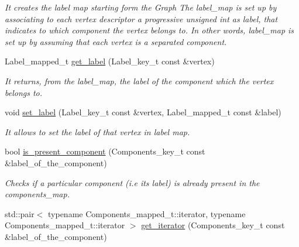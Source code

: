 \begin{DoxyCompactItemize}
\begin{DoxyCompactList}\small\item\em It creates the label map starting form the Graph  The label\_\-map is set up by associating to each vertex descriptor a progressive unsigned int as label, that indicates to which component the vertex belongs to. In other words, label\_\-map is set up by assuming that each vertex is a separated component. \item\end{DoxyCompactList}\item 
\hypertarget{classour__disjoint__sets_a0735914ff4a2a87ec7ee261f1a132a49}{
Label\_\-mapped\_\-t \hyperlink{classour__disjoint__sets_a0735914ff4a2a87ec7ee261f1a132a49}{get\_\-label} (Label\_\-key\_\-t const \&vertex)}
\label{classour__disjoint__sets_a0735914ff4a2a87ec7ee261f1a132a49}

\begin{DoxyCompactList}\small\item\em It returns, from the label\_\-map, the label of the component which the vertex belongs to. \item\end{DoxyCompactList}\item 
\hypertarget{classour__disjoint__sets_a0db082ada0847dac4d5f017a1dae9cde}{
void \hyperlink{classour__disjoint__sets_a0db082ada0847dac4d5f017a1dae9cde}{set\_\-label} (Label\_\-key\_\-t const \&vertex, Label\_\-mapped\_\-t const \&label)}
\label{classour__disjoint__sets_a0db082ada0847dac4d5f017a1dae9cde}

\begin{DoxyCompactList}\small\item\em It allows to set the label of that vertex in label map. \item\end{DoxyCompactList}\item 
\hypertarget{classour__disjoint__sets_a7fc838875896a173f94134c5cdb5e0a1}{
bool \hyperlink{classour__disjoint__sets_a7fc838875896a173f94134c5cdb5e0a1}{is\_\-present\_\-component} (Components\_\-key\_\-t const \&label\_\-of\_\-the\_\-component)}
\label{classour__disjoint__sets_a7fc838875896a173f94134c5cdb5e0a1}

\begin{DoxyCompactList}\small\item\em Checks if a particular component (i.e its label) is already present in the components\_\-map. \item\end{DoxyCompactList}\item 
\hypertarget{classour__disjoint__sets_adb24c138a4220087fb93f6f8d7a6c17e}{
std::pair$<$ typename Components\_\-mapped\_\-t::iterator, typename Components\_\-mapped\_\-t::iterator $>$ \hyperlink{classour__disjoint__sets_adb24c138a4220087fb93f6f8d7a6c17e}{get\_\-iterator} (Components\_\-key\_\-t const \&label\_\-of\_\-the\_\-component)}
\label{classour__disjoint__sets_adb24c138a4220087fb93f6f8d7a6c17e}


\end{DoxyCompactItemize}
